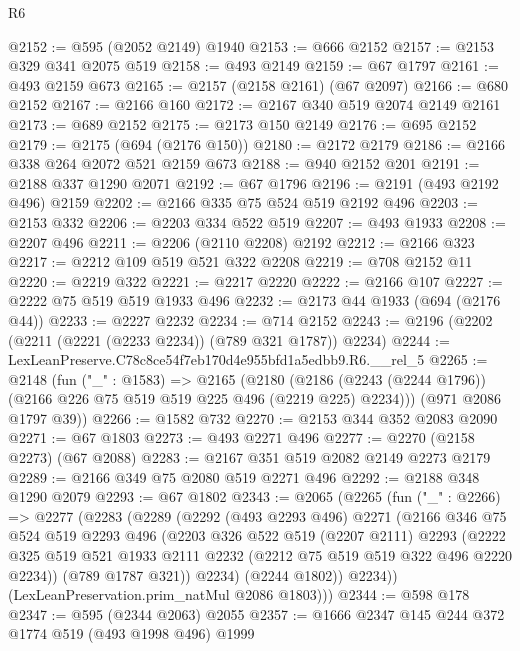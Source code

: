 \begin{lexlean}{R6}
\begin{coremodule}
@2152 := @595 (@2052 @2149) @1940
@2153 := @666 @2152
@2157 := @2153 @329 @341 @2075 @519
@2158 := @493 @2149
@2159 := @67 @1797
@2161 := @493 @2159 @673
@2165 := @2157 (@2158 @2161) (@67 @2097)
@2166 := @680 @2152
@2167 := @2166 @160
@2172 := @2167 @340 @519 @2074 @2149 @2161
@2173 := @689 @2152
@2175 := @2173 @150 @2149
@2176 := @695 @2152
@2179 := @2175 (@694 (@2176 @150))
@2180 := @2172 @2179
@2186 := @2166 @338 @264 @2072 @521 @2159 @673
@2188 := @940 @2152 @201
@2191 := @2188 @337 @1290 @2071
@2192 := @67 @1796
@2196 := @2191 (@493 @2192 @496) @2159
@2202 := @2166 @335 @75 @524 @519 @2192 @496
@2203 := @2153 @332
@2206 := @2203 @334 @522 @519
@2207 := @493 @1933
@2208 := @2207 @496
@2211 := @2206 (@2110 @2208) @2192
@2212 := @2166 @323
@2217 := @2212 @109 @519 @521 @322 @2208
@2219 := @708 @2152 @11
@2220 := @2219 @322
@2221 := @2217 @2220
@2222 := @2166 @107
@2227 := @2222 @75 @519 @519 @1933 @496
@2232 := @2173 @44 @1933 (@694 (@2176 @44))
@2233 := @2227 @2232
@2234 := @714 @2152
@2243 := @2196 (@2202 (@2211 (@2221 (@2233 @2234)) (@789 @321 @1787)) @2234)
@2244 := LexLeanPreserve.C78c8ce54f7eb170d4e955bfd1a5edbb9.R6.__rel_5
@2265 := @2148
    (fun ("_" : @1583) =>
    @2165
      (@2180 (@2186 (@2243 (@2244 @1796)) (@2166 @226 @75 @519 @519 @225 @496 (@2219 @225) @2234)))
      (@971 @2086 @1797 @39))
@2266 := @1582 @732
@2270 := @2153 @344 @352 @2083 @2090
@2271 := @67 @1803
@2273 := @493 @2271 @496
@2277 := @2270 (@2158 @2273) (@67 @2088)
@2283 := @2167 @351 @519 @2082 @2149 @2273 @2179
@2289 := @2166 @349 @75 @2080 @519 @2271 @496
@2292 := @2188 @348 @1290 @2079
@2293 := @67 @1802
@2343 := @2065
    (@2265
      (fun ("_" : @2266) =>
      @2277
        (@2283
          (@2289
            (@2292
              (@493 @2293 @496)
              @2271
              (@2166
                @346
                @75
                @524
                @519
                @2293
                @496
                (@2203
                  @326
                  @522
                  @519
                  (@2207 @2111)
                  @2293
                  (@2222
                    @325
                    @519
                    @521
                    @1933
                    @2111
                    @2232
                    (@2212 @75 @519 @519 @322 @496 @2220 @2234))
                  (@789 @1787 @321))
                @2234)
              (@2244 @1802))
            @2234))
        (LexLeanPreservation.prim_natMul @2086 @1803)))
@2344 := @598 @178
@2347 := @595 (@2344 @2063) @2055
@2357 := @1666 @2347 @145 @244 @372 @1774 @519 (@493 @1998 @496) @1999

\end{coremodule}
\end{lexlean}
